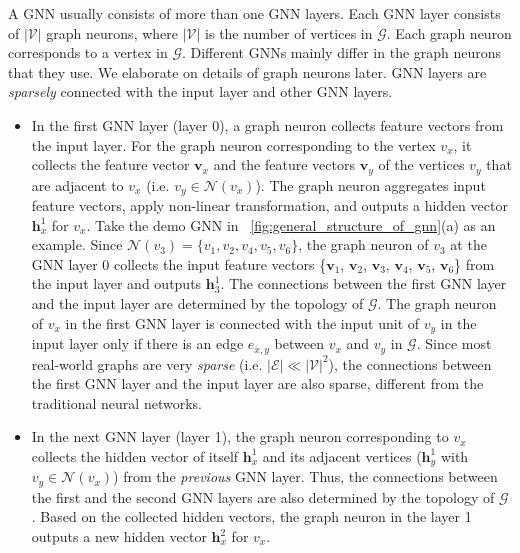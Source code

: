 A GNN usually consists of more than one GNN layers.
%
Each GNN layer consists of $|\mathcal{V}|$ graph neurons, where $|\mathcal{V}|$ is the number of vertices in $\mathcal{G}$.
%
Each graph neuron corresponds to a vertex in $\mathcal{G}$.
%
Different GNNs mainly differ in the graph neurons that they use.
%
We elaborate on details of graph neurons later.
%
GNN layers are \emph{sparsely} connected with the input layer and other GNN layers.
%
\begin{itemize}
    \item In the first GNN layer (layer 0), a graph neuron collects feature vectors from the input layer.
    For the graph neuron corresponding to the vertex $v_x$, it collects the feature vector $\boldsymbol{v}_x$ and the feature vectors $\boldsymbol{v}_y$ of the vertices $v_y$ that are adjacent to $v_x$ (i.e.  $v_y \in \mathcal{N}(v_x)$).
    The graph neuron aggregates input feature vectors, apply non-linear transformation, and outputs a hidden vector $\boldsymbol{h}^1_x$ for $v_x$.
    Take the demo GNN in \figurename~\ref{fig:general_structure_of_gnn}(a) as an example.
    Since $\mathcal{N}(v_3) = \{v_1, v_2, v_4, v_5, v_6\}$, the graph neuron of $v_3$ at the GNN layer 0 collects the input feature vectors \{$\boldsymbol{v}_1$, $\boldsymbol{v}_2$, $\boldsymbol{v}_3$, $\boldsymbol{v}_4$, $\boldsymbol{v}_5$, $\boldsymbol{v}_6$\} from the input layer and outputs $\boldsymbol{h}^1_3$.
    The connections between the first GNN layer and the input layer  are determined by the topology of $\mathcal{G}$.
    The graph neuron of $v_x$ in the first GNN layer is connected with the input unit of $v_y$  in the input layer only if there is an edge $e_{x,y}$ between $v_x$ and $v_y$ in $\mathcal{G}$.
    Since most real-world graphs are very \emph{sparse} (i.e. $|\mathcal{E}| \ll |\mathcal{V}|^2$), the connections between the first GNN layer and the input layer are also sparse, different from the traditional neural networks.
    
    \item In the next GNN layer (layer 1), the graph neuron corresponding to $v_x$ collects the hidden vector of itself $\boldsymbol{h}^1_x$ and its adjacent vertices ($\boldsymbol{h}^1_y$ with $v_y \in \mathcal{N}(v_x)$) from the \emph{previous} GNN layer.
    Thus, the connections between the first and the second GNN layers are also determined by the topology of $\mathcal{G}$.
    Based on the collected hidden vectors, the graph neuron in the layer 1 outputs a new hidden vector $\boldsymbol{h}^2_x$ for $v_x$.
   

\end{itemize}

